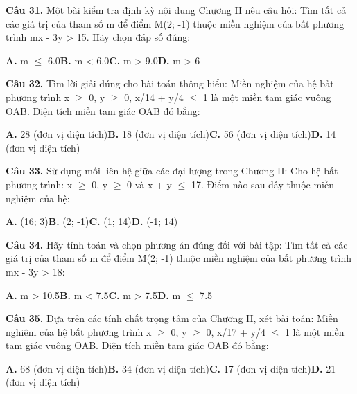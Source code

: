 \documentclass[11pt,a4paper]{article}
\begin{document}
\textbf{\color{primary} Câu 31.} Một bài kiểm tra định kỳ nội dung Chương II nêu câu hỏi: Tìm tất cả các giá trị của tham số m để điểm M(2; -1) thuộc miền nghiệm của bất phương trình mx - 3y > 15. Hãy chọn đáp số đúng:\par
\hspace*{1.5em}\textbf{A.} m $\le$ 6.0\quad\quad \textbf{B.} m < 6.0\quad\quad \textbf{C.} m > 9.0\quad\quad \textbf{D.} m > 6\par\vspace{2pt}
\textbf{\color{primary} Câu 32.} Tìm lời giải đúng cho bài toán thông hiểu: Miền nghiệm của hệ bất phương trình x $\ge$ 0, y $\ge$ 0, x/14 + y/4 $\le$ 1 là một miền tam giác vuông OAB. Diện tích miền tam giác OAB đó bằng:\par
\hspace*{1.5em}\textbf{A.} 28 (đơn vị diện tích)\quad\quad \textbf{B.} 18 (đơn vị diện tích)\quad\quad \textbf{C.} 56 (đơn vị diện tích)\quad\quad \textbf{D.} 14 (đơn vị diện tích)\par\vspace{2pt}
\textbf{\color{primary} Câu 33.} Sử dụng mối liên hệ giữa các đại lượng trong Chương II: Cho hệ bất phương trình: x $\ge$ 0, y $\ge$ 0 và x + y $\le$ 17. Điểm nào sau đây thuộc miền nghiệm của hệ:\par
\hspace*{1.5em}\textbf{A.} (16; 3)\quad\quad \textbf{B.} (2; -1)\quad\quad \textbf{C.} (1; 14)\quad\quad \textbf{D.} (-1; 14)\par\vspace{2pt}
\textbf{\color{primary} Câu 34.} Hãy tính toán và chọn phương án đúng đối với bài tập: Tìm tất cả các giá trị của tham số m để điểm M(2; -1) thuộc miền nghiệm của bất phương trình mx - 3y > 18:\par
\hspace*{1.5em}\textbf{A.} m > 10.5\quad\quad \textbf{B.} m < 7.5\quad\quad \textbf{C.} m > 7.5\quad\quad \textbf{D.} m $\le$ 7.5\par\vspace{2pt}
\textbf{\color{primary} Câu 35.} Dựa trên các tính chất trọng tâm của Chương II, xét bài toán: Miền nghiệm của hệ bất phương trình x $\ge$ 0, y $\ge$ 0, x/17 + y/4 $\le$ 1 là một miền tam giác vuông OAB. Diện tích miền tam giác OAB đó bằng:\par
\hspace*{1.5em}\textbf{A.} 68 (đơn vị diện tích)\quad\quad \textbf{B.} 34 (đơn vị diện tích)\quad\quad \textbf{C.} 17 (đơn vị diện tích)\quad\quad \textbf{D.} 21 (đơn vị diện tích)\par\vspace{2pt}
\end{document}

